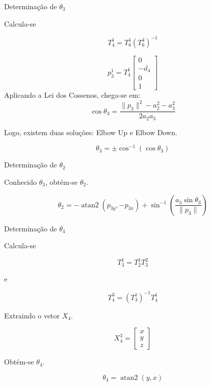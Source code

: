 \documentclass[xcolor=dvipsnames,aspectratio=169]{beamer}
\begin{document}
\begin{frame}{Determinação de $\theta_3$}

    Calcula-se

    \[
        {}T_4^{1}=
        T_6^{1}
        (T_6^{4})^{-1}
    \]


    \[
        p_3^{1}
            =
            T_4^{1}
        \begin{bmatrix}
            0    \\
            -d_4 \\
            0    \\
            1
        \end{bmatrix}
    \]
    Aplicando a Lei dos Cossenos, chega-se em:
    \[
        \cos\theta_3=
        \frac{
            \|p_3\|^2
            -a_2^2
            -a_3^2
        }
        {2a_2a_3}
    \]

    Logo, existem duas soluções: Elbow Up e Elbow Down.

    \[
        \theta_3=
        \pm
        \cos^{-1}
        (\cos\theta_3)
    \]

\end{frame}

\begin{frame}{Determinação de $\theta_2$}

    Conhecido $\theta_3$, obtém-se \(\theta_2\).

    \[
        \theta_2
        =
        -\operatorname{atan2}
        (p_{3y},-p_{3x})
        +
        \sin^{-1}
        \left(
        \frac{
            a_3\sin\theta_3
        }
        {\|p_3\|}
        \right)
    \]

\end{frame}

\begin{frame}{Determinação de $\theta_4$}

    Calcula-se

    \[
        T_3^{1}
            =
            T_2^{1}
            T_3^{2}
    \]

    e

    \[
        T_4^{3}
        =
        (T_3^{1})^{-1}
        T_4^{1}
    \]

    Extraindo o vetor $X_4$.

    \[
        X_4^{3}
        =
        \begin{bmatrix}
            x \\
            y \\
            z
        \end{bmatrix}
    \]

    Obtém-se \(\theta_4\).

    \[
        \boxed{
            \theta_4
            =
            \operatorname{atan2}(y,x)
        }
    \]

\end{frame}
\end{document}
